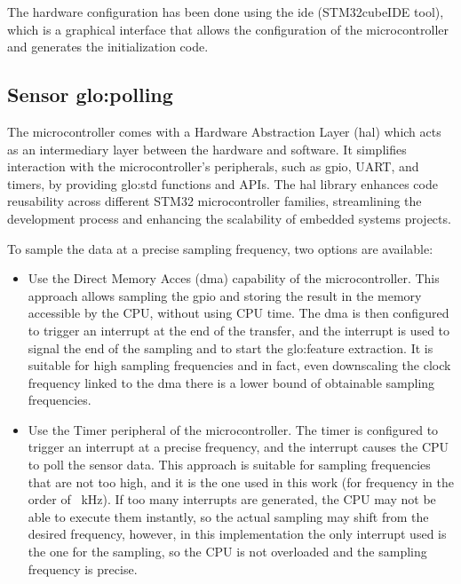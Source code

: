 The hardware configuration has been done using the \gls{ide} ({STM32cubeIDE} tool), which is a graphical interface that allows the configuration of the microcontroller and generates the initialization code. 

\subsection{Sensor \gls{glo:polling}}
The microcontroller comes with a Hardware Abstraction Layer (\gls{hal}) which acts as an intermediary layer between the hardware and software. It simplifies interaction with the microcontroller's peripherals, such as \gls{gpio}, UART, and timers, by providing \gls{glo:std} functions and APIs. The \gls{hal} library enhances code reusability across different STM32 microcontroller families, streamlining the development process and enhancing the scalability of embedded systems projects.

To sample the data at a precise sampling frequency, two options are available:
\begin{itemize}
    \item Use the Direct Memory Acces (\gls{dma}) capability of the microcontroller. This approach allows sampling the \gls{gpio} and storing the result in the memory accessible by the CPU, without using CPU time. The \gls{dma} is then configured to trigger an interrupt at the end of the transfer, and the interrupt is used to signal the end of the sampling and to start the \gls{glo:feature} extraction. It is suitable for high sampling frequencies and in fact, even downscaling the clock frequency linked to the \gls{dma} there is a lower bound of obtainable sampling frequencies.
    \item Use the Timer peripheral of the microcontroller. The timer is configured to trigger an interrupt at a precise frequency, and the interrupt causes the CPU to poll the sensor data. This approach is suitable for sampling frequencies that are not too high, and it is the one used in this work (for frequency in the order of \SI{ }{\kilo\hertz}).
    If too many interrupts are generated, the CPU may not be able to execute them instantly, so the actual sampling may shift from the desired frequency, however, in this implementation the only interrupt used is the one for the sampling, so the CPU is not overloaded and the sampling frequency is precise.
\end{itemize}


